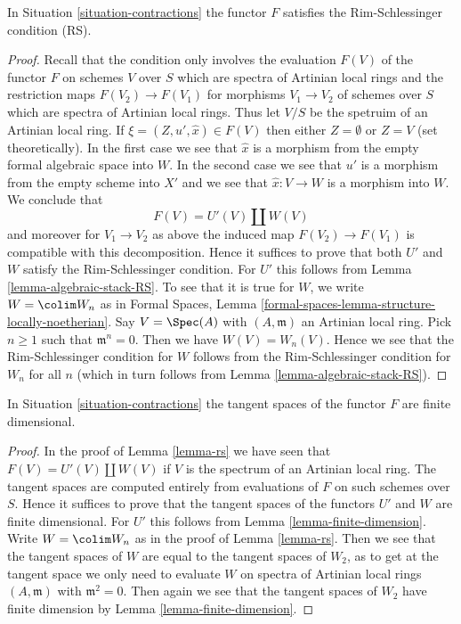 \begin{lemma}
\label{lemma-rs}
In Situation \ref{situation-contractions} the functor $F$ satisfies
the Rim-Schlessinger condition (RS).
\end{lemma}

\begin{proof}
Recall that the condition only involves the evaluation $F(V)$ of the functor
$F$ on schemes $V$ over $S$ which are spectra of Artinian local rings
and the restriction maps $F(V_2) \to F(V_1)$ for morphisms $V_1 \to V_2$
of schemes over $S$ which are spectra of Artinian local rings.
Thus let $V/S$ be the spetruim of an Artinian local ring.
If $\xi = (Z, u', \hat x) \in F(V)$ then either $Z = \emptyset$
or $Z = V$ (set theoretically). In the first case we see that
$\hat x$ is a morphism from the empty formal algebraic space
into $W$. In the second case we see that $u'$ is a morphism from
the empty scheme into $X'$ and we see that $\hat x : V \to W$
is a morphism into $W$. We conclude that
$$
F(V) = U'(V) \amalg W(V)
$$
and moreover for $V_1 \to V_2$ as above the induced map
$F(V_2) \to F(V_1)$ is compatible with this decomposition.
Hence it suffices to prove that both $U'$ and $W$ satisfy the
Rim-Schlessinger condition. For $U'$ this follows from
Lemma \ref{lemma-algebraic-stack-RS}.
To see that it is true for $W$, we write $W = \colim W_n$ as in
Formal Spaces, Lemma
\ref{formal-spaces-lemma-structure-locally-noetherian}.
Say $V = \Spec(A)$ with $(A, \mathfrak m)$ an Artinian local ring.
Pick $n \geq 1$ such that $\mathfrak m^n = 0$. Then we have
$W(V) = W_n(V)$. Hence we see that the Rim-Schlessinger condition
for $W$ follows from the Rim-Schlessinger condition for $W_n$ for
all $n$ (which in turn follows from
Lemma \ref{lemma-algebraic-stack-RS}).
\end{proof}

\begin{lemma}
\label{lemma-finite-dim}
In Situation \ref{situation-contractions} the tangent spaces of
the functor $F$ are finite dimensional.
\end{lemma}

\begin{proof}
In the proof of Lemma \ref{lemma-rs} we have seen that
$F(V) = U'(V) \amalg W(V)$ if $V$ is the spectrum of an Artinian
local ring. The tangent spaces are computed entirely from evaluations
of $F$ on such schemes over $S$.
Hence it suffices to prove that the tangent spaces
of the functors $U'$ and $W$ are finite dimensional.
For $U'$ this follows from
Lemma \ref{lemma-finite-dimension}.
Write $W = \colim W_n$ as in the proof of Lemma \ref{lemma-rs}.
Then we see that the tangent spaces of $W$ are equal to the
tangent spaces of $W_2$, as to get at the tangent space
we only need to evaluate $W$ on spectra of Artinian local
rings $(A, \mathfrak m)$ with $\mathfrak m^2 = 0$.
Then again we see that the tangent spaces of $W_2$ have
finite dimension by
Lemma \ref{lemma-finite-dimension}.
\end{proof}

